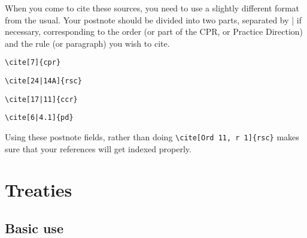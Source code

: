 \documentclass[a5paper,fontsize=9pt,DIV=1]{scrartcl}
\newcommand{\egcite}[1]{\texttt{\textbackslash cite#1}}
\begin{document}
When you come to cite these sources, you need to use a slightly
different format from the usual. Your postnote should be divided into
two parts, separated by | if necessary, corresponding to the order (or
part of the CPR, or Practice Direction) and the rule (or paragraph)
you wish to cite.

\begin{description}
\item[\egcite{[7]\{cpr\}}] \cite[7]{cpr}
\item[\egcite{[24|14A]\{rsc\}}] \cite[24|14A]{rsc}
\item[\egcite{[17|11]\{ccr\}}] \cite[17|11]{ccr}
\item[\egcite{[6|4.1]\{pd\}}] \cite[6|4.1]{pd}
\end{description}

Using these postnote fields, rather than doing
\verb|\cite[Ord 11, r 1]{rsc}| makes sure that your references will
get indexed properly.


\section{Treaties\label{piltreaties}}

\subsection{Basic use}
\end{document}
